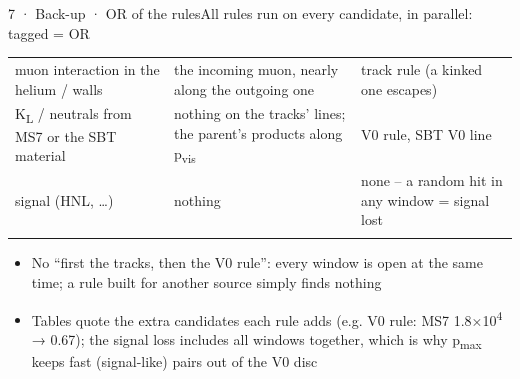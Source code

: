 \begin{btframe}{7 · Back-up · OR of the rules}{All rules run on every candidate, in parallel: tagged = OR}
{\begin{tabularx}{\linewidth}{>{\raggedright\arraybackslash}X>{\raggedright\arraybackslash}X>{\raggedright\arraybackslash}X}
muon interaction in the helium / walls & the incoming muon, nearly along the outgoing one & track rule (a kinked one escapes) \\\rowrule
K\textsubscript{L} / neutrals from MS7 or the SBT material & nothing on the tracks' lines; the parent's products along p\textsubscript{vis} & V0 rule, SBT V0 line \\\rowrule
\rowcolor{tint}signal (HNL, …) & nothing & none -- a random hit in any window = signal lost \\\rowrule
\end{tabularx}\par}
\vspace{3pt}
{\fontsize{6.15pt}{8.60pt}\selectfont
\begin{itemize}
  \item No “first the tracks, then the V0 rule”: every window is open at the same time; a rule built for another source simply finds nothing
  \item Tables quote the extra candidates each rule adds (e.g. V0 rule: MS7 1.8×10\textsuperscript{4} → 0.67); the signal loss includes all windows together, which is why p\textsubscript{max} keeps fast (signal-like) pairs out of the V0 disc
\end{itemize}}
\end{btframe}
